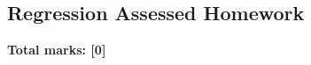\documentclass[../s1]{subfiles}
\begin{document}
\subsection*{Regression Assessed Homework}
\thispagestyle{fancy}



\begin{flushright}
\textbf{Total marks: [0]}
\end{flushright}
\end{document}
